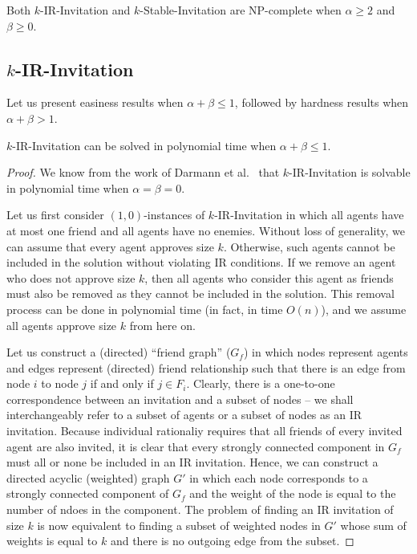 \begin{theorem} \label{SIP:thm:nphard_a2_b0}
	Both $k$-IR-Invitation and $k$-Stable-Invitation are NP-complete when $\alpha \geq 2$ and $\beta \geq 0$. 
\end{theorem} 

\subsection{$k$-IR-Invitation}

Let us present easiness results when $\alpha + \beta \leq 1$, followed by hardness results when $\alpha + \beta > 1$. 

\begin{theorem} \label{SIP:thm:IR_invitation_P}
	$k$-IR-Invitation can be solved in polynomial time when $\alpha + \beta \leq 1$.
\end{theorem} 
\begin{proof}
We know from the work of Darmann et al.~\cite{GASP12WINE} that $k$-IR-Invitation is solvable in polynomial time when $\alpha = \beta = 0$.
	
	Let us first consider $(1, 0)$-instances of $k$-IR-Invitation in which all agents have at most one friend and all agents have no enemies. Without loss of generality, we can assume that every agent approves size $k$. Otherwise, such agents cannot be included in the solution without violating IR conditions. If we remove an agent who does not approve size $k$, then all agents who consider this agent as friends must also be removed as they cannot be included in the solution. This removal process can be done in polynomial time (in fact, in time $O(n)$), and we assume all agents approve size $k$ from here on. 
	
	Let us construct a (directed) ``friend graph'' ($G_f$) in which nodes represent agents and edges represent (directed) friend relationship such that there is an edge from node $i$ to node $j$ if and only if $j \in F_i$. Clearly, there is a one-to-one correspondence between an invitation and a subset of nodes -- we shall interchangeably refer to a subset of agents or a subset of nodes as an IR invitation. Because individual rationaliy requires that all friends of every invited agent are also invited, it is clear that every strongly connected component in $G_f$ must all or none be included in an IR invitation. Hence, we can construct a directed acyclic (weighted) graph $G'$ in which each node corresponds to a strongly connected component of $G_f$ and the weight of the node is equal to the number of ndoes in the component. The problem of finding an IR invitation of size $k$ is now equivalent to finding a subset of weighted nodes in $G'$ whose sum of weights is equal to $k$ and there is no outgoing edge from the subset. 


\end{proof}




